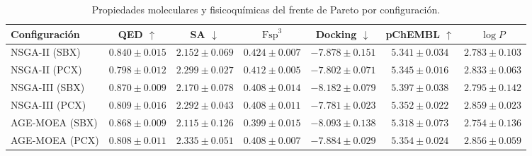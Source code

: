 \begin{table}[htbp]
\centering
\caption{Propiedades moleculares y fisicoquímicas del frente de Pareto por configuración.}
\label{tab:propiedades}
\begin{tabular}{lcccccc}
\toprule
Configuración & QED $\uparrow$ & SA $\downarrow$ & $\text{Fsp}^3$ & Docking $\downarrow$ & pChEMBL $\uparrow$ & $\log P$ \\
\midrule
NSGA-II (SBX) & $0.840 \pm 0.015$ & $2.152 \pm 0.069$ & $0.424 \pm 0.007$ & $-7.878 \pm 0.151$ & $5.341 \pm 0.034$ & $2.783 \pm 0.103$ \\
NSGA-II (PCX) & $0.798 \pm 0.012$ & $2.299 \pm 0.027$ & $0.412 \pm 0.005$ & $-7.802 \pm 0.071$ & $5.345 \pm 0.016$ & $2.833 \pm 0.063$ \\
NSGA-III (SBX) & $\mathbf{0.870 \pm 0.009}$ & $2.170 \pm 0.078$ & $0.408 \pm 0.014$ & $\mathbf{-8.182 \pm 0.079}$ & $\mathbf{5.397 \pm 0.038}$ & $2.795 \pm 0.142$ \\
NSGA-III (PCX) & $0.809 \pm 0.016$ & $2.292 \pm 0.043$ & $0.408 \pm 0.011$ & $-7.781 \pm 0.023$ & $5.352 \pm 0.022$ & $2.859 \pm 0.023$ \\
AGE-MOEA (SBX) & $0.868 \pm 0.009$ & $\mathbf{2.115 \pm 0.126}$ & $0.399 \pm 0.015$ & $-8.093 \pm 0.138$ & $5.318 \pm 0.073$ & $2.754 \pm 0.136$ \\
AGE-MOEA (PCX) & $0.808 \pm 0.011$ & $2.335 \pm 0.051$ & $0.408 \pm 0.007$ & $-7.884 \pm 0.029$ & $5.354 \pm 0.024$ & $2.856 \pm 0.059$ \\
\bottomrule
\end{tabular}
\end{table}